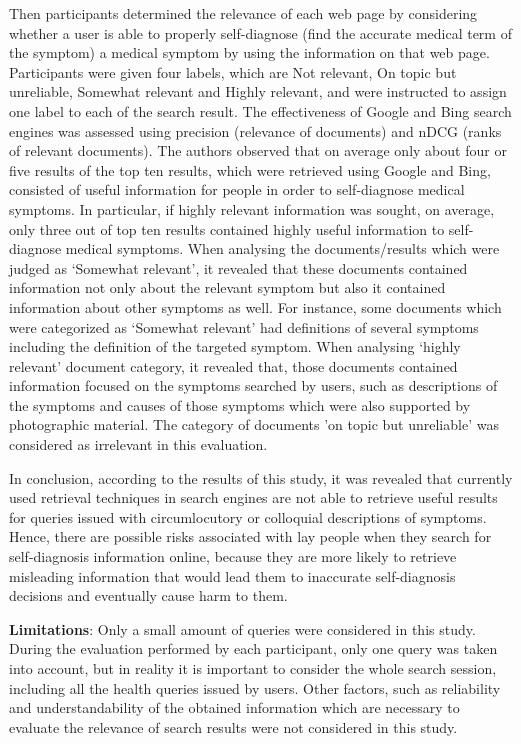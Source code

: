 \documentclass[]{article}
\begin{document}
Then participants determined the relevance of each web page by considering whether a user is able to properly self-diagnose (find the accurate medical term of the symptom) a medical symptom by using the information on that web page. Participants were given four labels, which are Not relevant, On topic but unreliable, Somewhat relevant and Highly relevant, and were instructed to assign one label to each of the search result. The effectiveness of Google and Bing search engines was assessed using precision (relevance of documents) and nDCG (ranks of relevant documents). The authors observed that on average only about four or five results of the top ten results, which were retrieved using Google and Bing, consisted of useful information for people in order to self-diagnose medical symptoms. In particular, if highly relevant information was sought, on average, only three out of top ten results contained highly useful information to self-diagnose medical symptoms. When analysing the documents/results which were judged as ‘Somewhat relevant’, it revealed that these documents contained information not only about the relevant symptom but also it contained information about other symptoms as well. For instance, some documents which were categorized as ‘Somewhat relevant’ had definitions of several symptoms including the definition of the targeted symptom. When analysing ‘highly relevant’ document category, it revealed that, those documents contained information focused on the symptoms searched by users, such as descriptions of the symptoms and causes of those symptoms which were also supported by photographic material. The category of documents 'on topic but unreliable' was considered as irrelevant in this evaluation.  

In conclusion, according to the results of this study, it was revealed that currently used retrieval techniques in search engines are not able to retrieve useful results for queries issued with circumlocutory or colloquial descriptions of symptoms. Hence, there are possible risks associated with lay people when they search for self-diagnosis information online, because they are more likely to retrieve misleading information that would lead them to inaccurate self-diagnosis decisions and eventually cause harm to them.   

\textbf{Limitations}: Only a small amount of queries were considered in this study. 
During the evaluation performed by each participant, only one query was taken into account, but in reality it is important to consider the whole search session, including all the health queries issued by users. Other factors, such as reliability and understandability of the obtained information which are necessary to evaluate the relevance of search results were not considered in this study.
\end{document}
